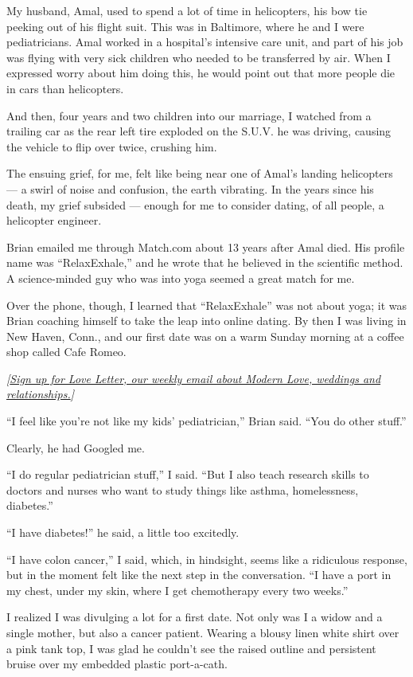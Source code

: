 My husband, Amal, used to spend a lot of time in helicopters, his bow
tie peeking out of his flight suit. This was in Baltimore, where he and
I were pediatricians. Amal worked in a hospital's intensive care unit,
and part of his job was flying with very sick children who needed to be
transferred by air. When I expressed worry about him doing this, he
would point out that more people die in cars than helicopters.

And then, four years and two children into our marriage, I watched from
a trailing car as the rear left tire exploded on the S.U.V. he was
driving, causing the vehicle to flip over twice, crushing him.

The ensuing grief, for me, felt like being near one of Amal's landing
helicopters --- a swirl of noise and confusion, the earth vibrating. In
the years since his death, my grief subsided --- enough for me to
consider dating, of all people, a helicopter engineer.

Brian emailed me through Match.com about 13 years after Amal died. His
profile name was ``RelaxExhale,'' and he wrote that he believed in the
scientific method. A science-minded guy who was into yoga seemed a great
match for me.

Over the phone, though, I learned that ``RelaxExhale'' was not about
yoga; it was Brian coaching himself to take the leap into online dating.
By then I was living in New Haven, Conn., and our first date was on a
warm Sunday morning at a coffee shop called Cafe Romeo.

\emph{{[}}\href{https://www.nytimes3xbfgragh.onion/newsletters/love-letter}{\emph{Sign
up for Love Letter, our weekly email about Modern Love, weddings and
relationships.}}\emph{{]}}

``I feel like you're not like my kids' pediatrician,'' Brian said. ``You
do other stuff.''

Clearly, he had Googled me.

``I do regular pediatrician stuff,'' I said. ``But I also teach research
skills to doctors and nurses who want to study things like asthma,
homelessness, diabetes.''

``I have diabetes!'' he said, a little too excitedly.

``I have colon cancer,'' I said, which, in hindsight, seems like a
ridiculous response, but in the moment felt like the next step in the
conversation. ``I have a port in my chest, under my skin, where I get
chemotherapy every two weeks.''

I realized I was divulging a lot for a first date. Not only was I a
widow and a single mother, but also a cancer patient. Wearing a blousy
linen white shirt over a pink tank top, I was glad he couldn't see the
raised outline and persistent bruise over my embedded plastic
port-a-cath.

